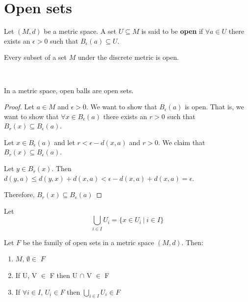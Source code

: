 \section{Open sets} 
\begin{definition}
	Let $(M,d)$ be a metric space. A set $U \subseteq M$ is said to be \textbf{open} if $\forall a\in U$ there exists an $\epsilon >0$ such that $B_\epsilon (a) \subseteq U$. 
\end{definition}
\begin{example}
	Every subset of a set $M$ under the discrete metric is open. 
\end{example}

\mbox{ } 
\begin{smallfact}
	In a metric space, open balls are open sets. 
\end{smallfact}
\begin{proof}
	Let $a \in M$ and $\epsilon >0$. We want to show that $B_\epsilon (a)$ is open. That is, we want to show that $\forall x \in B_\epsilon (a)$ there exists an $r>0$ such that $B_r (x) \subseteq B_\epsilon (a)$.
	
	Let $x \in B_\epsilon (a)$ and let $r < \epsilon - d(x,a)$ and $r > 0$. We claim that $B_r (x) \subseteq B_\epsilon (a)$. 
	
	Let $y \in B_r (x)$. Then $d(y,a)\leq d(y,x) + d(x,a) < \epsilon - d(x,a) + d(x,a)= \epsilon$.
	
	Therefore, $B_r (x) \subseteq B_\epsilon (a)$ 
\end{proof}
\begin{definition}
	Let
	\[\bigcup_{i \in I} U_i = \{x \in U_i\ |\ i \in I\}\]
\end{definition}
\begin{theorem}
	
	Let $F$ be the family of open sets in a metric space $(M,d)$. Then: 
	\begin{enumerate}
		\item $M$, $\emptyset \in$ $F$ 
		\item If U, V $\in$ F then U $\cap$ V $\in$ F 
		\item If $\forall i \in I$, $U_i \in F$ then $\bigcup_{i \in I} U_i \in F$ 
	\end{enumerate}
\end{theorem}
